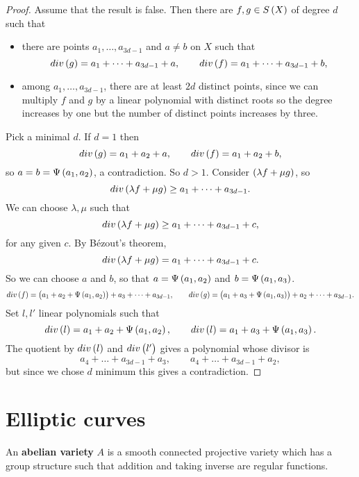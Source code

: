 \begin{proof}
Assume that the result is false. Then there are $ f, g \in S\br{X} $ of degree $ d $ such that
\begin{itemize}
\item there are points $ a_1, \dots, a_{3d - 1} $ and $ a \ne b $ on $ X $ such that
$$ div\br{g} = a_1 + \dots + a_{3d - 1} + a, \qquad div\br{f} = a_1 + \dots + a_{3d - 1} + b, $$
\item among $ a_1, \dots, a_{3d - 1} $, there are at least $ 2d $ distinct points, since we can multiply $ f $ and $ g $ by a linear polynomial with distinct roots so the degree increases by one but the number of distinct points increases by three.
\end{itemize}
Pick a minimal $ d $. If $ d = 1 $ then
$$ div\br{g} = a_1 + a_2 + a, \qquad div\br{f} = a_1 + a_2 + b, $$
so $ a = b = \Psi\br{a_1, a_2} $, a contradiction. So $ d > 1 $. Consider $ \br{\lambda f + \mu g} $, so
$$ div\br{\lambda f + \mu g} \ge a_1 + \dots + a_{3d - 1}. $$
We can choose $ \lambda, \mu $ such that
$$ div\br{\lambda f + \mu g} \ge a_1 + \dots + a_{3d - 1} + c, $$
for any given $ c $. By B\'ezout's theorem,
$$ div\br{\lambda f + \mu g} = a_1 + \dots + a_{3d - 1} + c. $$
So we can choose $ a $ and $ b $, so that $ a = \Psi\br{a_1, a_2} $ and $ b = \Psi\br{a_1, a_3} $.
$$ div\br{f} = \br{a_1 + a_2 + \Psi\br{a_1, a_2}} + a_3 + \dots + a_{3d - 1}, \qquad div\br{g} = \br{a_1 + a_3 + \Psi\br{a_1, a_3}} + a_2 + \dots + a_{3d - 1}. $$
Set $ l, l' $ linear polynomials such that
$$ div\br{l} = a_1 + a_2 + \Psi\br{a_1, a_2}, \qquad div\br{l} = a_1 + a_3 + \Psi\br{a_1, a_3}. $$
The quotient by $ div\br{l} $ and $ div\br{l'} $ gives a polynomial whose divisor is
$$ a_4 + \dots + a_{3d - 1} + a_3, \qquad a_4 + \dots + a_{3d - 1} + a_2, $$
but since we chose $ d $ minimum this gives a contradiction.
\end{proof}

\pagebreak

\section{Elliptic curves}


\begin{definition}
An \textbf{abelian variety} $ A $ is a smooth connected projective variety which has a group structure such that addition and taking inverse are regular functions.
\end{definition}

